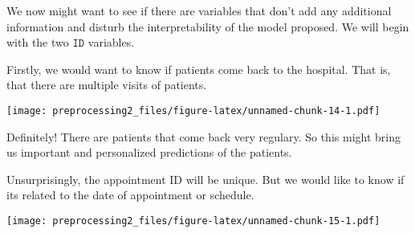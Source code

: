 \documentclass[]{article}
\newenvironment{Shaded}{\begin{snugshade}}{\end{snugshade}}
\newcommand{\KeywordTok}[1]{\textcolor[rgb]{0.13,0.29,0.53}{\textbf{#1}}}
\newcommand{\DataTypeTok}[1]{\textcolor[rgb]{0.13,0.29,0.53}{#1}}
\newcommand{\DecValTok}[1]{\textcolor[rgb]{0.00,0.00,0.81}{#1}}
\newcommand{\StringTok}[1]{\textcolor[rgb]{0.31,0.60,0.02}{#1}}
\newcommand{\CommentTok}[1]{\textcolor[rgb]{0.56,0.35,0.01}{\textit{#1}}}
\newcommand{\OperatorTok}[1]{\textcolor[rgb]{0.81,0.36,0.00}{\textbf{#1}}}
\newcommand{\NormalTok}[1]{#1}
\begin{document}
We now might want to see if there are variables that don't add any
additional information and disturb the interpretability of the model
proposed. We will begin with the two \(\texttt{ID}\) variables.

Firstly, we would want to know if patients come back to the hospital.
That is, that there are multiple visits of patients.

\begin{Shaded}
\end{Shaded}

\texttt{[image: preprocessing2\_files/figure-latex/unnamed-chunk-14-1.pdf]}

Definitely! There are patients that come back very regulary. So this
might bring us important and personalized predictions of the patients.

Unsurprisingly, the appointment ID will be unique. But we would like to
know if its related to the date of appointment or schedule.

\begin{Shaded}
\end{Shaded}

\texttt{[image: preprocessing2\_files/figure-latex/unnamed-chunk-15-1.pdf]}
\end{document}
